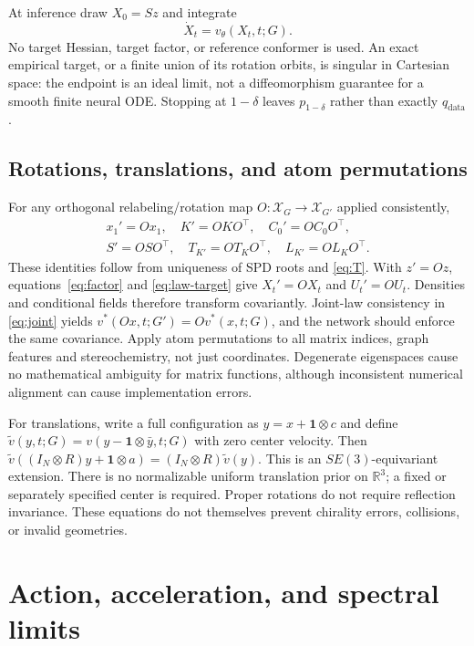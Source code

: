 \documentclass[11pt,letterpaper]{article}
\newcommand{\R}{\mathbb R}
\begin{document}
At inference draw $X_0=Sz$ and integrate
\begin{equation}
\dot X_t=v_\theta(X_t,t;G).
\label{eq:inference}
\end{equation}
No target Hessian, target factor, or reference conformer is used. An exact empirical target, or a finite union of its rotation orbits, is singular in Cartesian space: the endpoint is an ideal limit, not a diffeomorphism guarantee for a smooth finite neural ODE. Stopping at $1-\delta$ leaves $p_{1-\delta}$ rather than exactly $q_{\mathrm{data}}$.

\subsection{Rotations, translations, and atom permutations}
For any orthogonal relabeling/rotation map $O:\mathcal X_G\to\mathcal X_{G'}$ applied consistently,
\begin{equation}
\begin{gathered}
x_1'=Ox_1,\quad K'=OKO^\top,\quad C_0'=OC_0O^\top,\\
S'=OSO^\top,\quad T_{K'}=OT_KO^\top,\quad L_{K'}=OL_KO^\top.
\end{gathered}
\label{eq:symmetry-matrices}
\end{equation}
These identities follow from uniqueness of SPD roots and \eqref{eq:T}. With $z'=Oz$, equations~\eqref{eq:factor} and \eqref{eq:law-target} give $X_t'=OX_t$ and $U_t'=OU_t$. Densities and conditional fields therefore transform covariantly. Joint-law consistency in \eqref{eq:joint} yields $v^*(Ox,t;G')=Ov^*(x,t;G)$, and the network should enforce the same covariance. Apply atom permutations to all matrix indices, graph features and stereochemistry, not just coordinates. Degenerate eigenspaces cause no mathematical ambiguity for matrix functions, although inconsistent numerical alignment can cause implementation errors.

For translations, write a full configuration as $y=x+\mathbf1\otimes c$ and define $\widetilde v(y,t;G)=v(y-\mathbf1\otimes\bar y,t;G)$ with zero center velocity. Then $\widetilde v((I_N\otimes R)y+\mathbf1\otimes a)= (I_N\otimes R)\widetilde v(y)$. This is an $SE(3)$-equivariant extension. There is no normalizable uniform translation prior on $\R^3$; a fixed or separately specified center is required. Proper rotations do not require reflection invariance. These equations do not themselves prevent chirality errors, collisions, or invalid geometries.

\section{Action, acceleration, and spectral limits}
\label{sec:bounds}
\end{document}
